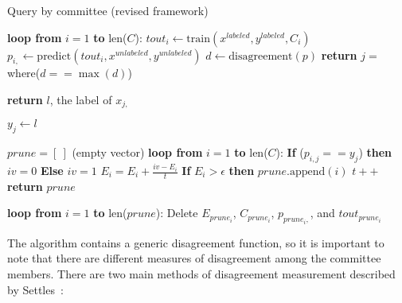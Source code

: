 \tablespacing
\begin{algorithm}[H]
	\caption{Query by committee (revised framework)}\label{euclid}
	\begin{algorithmic}[1]
		
		\State \textbf{loop from} $i=1$ \textbf{to} len($C$):
		\State \indent $\textit{tout}_i \gets 
		\text{train}(x^{labeled},y^{labeled},C_i)$
		\State \indent $p_{i,} \gets 
		\text{predict}(\textit{tout}_i,x^{unlabeled},y^{unlabeled})$
		\State $d \gets \text{disagreement}(p)$
		\State \textbf{return} $j =$ where($d==\max{(d)}$)
		\EndFunction
		
		\State \textbf{return} $l$, the label of $x_{j,}$
		\EndFunction
		
		\State $y_j \gets l$
		
		\State $prune = [\ ]$ (empty vector)	
		\State \textbf{loop from} $i=1$ \textbf{to} len($C$):
		\State \indent \textbf{If} ($p_{i,j}==y_j$) \textbf{then} $iv = 0$ 
		\textbf{Else} $iv = 1$
		\State \indent $E_i = E_i + \frac{iv - E_i}{t}$
		\State \indent \textbf{If} $E_i>\epsilon$ \textbf{then} 
		$prune.\text{append}(i)$
		\State $t++$
		\State \textbf{return} $prune$
		\EndFunction
		
		\State \textbf{loop from} $i=1$ \textbf{to} len($prune$):
		\State \indent Delete $E_{prune_i}$, $C_{prune_i}$, $p_{prune_i,}$, 
		and $\textit{tout}_{prune_i}$
		
		\EndProcedure
	\end{algorithmic}
\end{algorithm}
\bodyspacing

The algorithm contains a generic disagreement function, so it is important to 
note that there are different measures of disagreement among the committee 
members. There are two main methods of disagreement 
measurement described by Settles~\cite{settles2010}:

